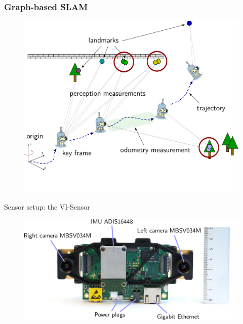 \documentclass[11pt]{beamer}
\begin{document}
\begin{frame}
\frametitle{Graph-based SLAM}
\begin{figure}[!htb]
\centering
\includegraphics[height=0.925\textheight]{figures/approach_fundamentals/overview_graphslam_simplified.pdf}
\end{figure}
\end{frame}

\begin{frame}{Sensor setup: the VI-Sensor}
\begin{figure}[!htb]
\centering
\includegraphics[width=\textwidth]{figures/introduction/vi_sensor_details.pdf}
\end{figure}
\end{frame}
\end{document}
